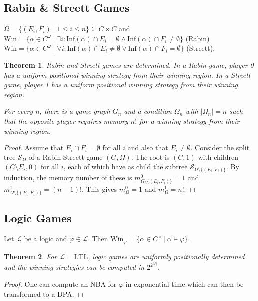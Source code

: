 \documentclass{article}
\newtheorem{theorem}{Theorem}
\begin{document}
\vspace{1.5cm}
\subsection{Rabin \& Streett Games}
$\Omega = \{(E_i, F_i) \mid 1 \leq i \leq n\} \subseteq C \times C$ and \\
$\text{Win} = \{ \alpha \in C^\omega \mid \exists i: \text{Inf}(\alpha) \cap E_i = \emptyset \land \text{Inf}(\alpha) \cap F_i \neq \emptyset \}$ (Rabin) \\
$\text{Win} = \{ \alpha \in C^\omega \mid \forall i: \text{Inf}(\alpha) \cap E_i \neq \emptyset \lor \text{Inf}(\alpha) \cap F_i = \emptyset \}$ (Streett).

\begin{theorem}
	Rabin and Streett games are determined. In a Rabin game, player 0 has a uniform positional winning strategy from their winning region. In a Streett game, player 1 has a uniform positional winning strategy from their winning region. 
	
	For every $n$, there is a game graph $G_n$ and a condition $\Omega_n$ with $|\Omega_n| = n$ such that the opposite player requires memory $n!$ for a winning strategy from their winning region.
\end{theorem}
\begin{proof}
	Assume that $E_i \cap F_i = \emptyset$ for all $i$ and also that $E_i \neq \emptyset$. Consider the split tree $\mathcal{S}_\Omega$ of a Rabin-Streett game $(G, \Omega)$. The root is $(C, 1)$ with children $(C \setminus E_i, 0)$ for all $i$, each of which have as child the subtree $\mathcal{S}_{\Omega \setminus \{(E_i, F_i)\}}$. By induction, the memory number of these is $m_{\Omega \setminus \{(E_i, F_i)\}}^0 = 1$ and $m_{\Omega \setminus \{(E_i, F_i)\}}^1 = (n-1)!$. This gives $m^0_\Omega = 1$ and $m^1_\Omega = n!$.
\end{proof}

\vspace{1.5cm}
\subsection{Logic Games}
Let $\mathcal{L}$ be a logic and $\varphi \in \mathcal{L}$. Then $\text{Win}_\varphi = \{ \alpha \in C^\omega \mid \alpha \models \varphi \}$.

\begin{theorem}
	For $\mathcal{L} = \text{LTL}$, logic games are uniformly positionally determined and the winning strategies can be computed in $2^{2^{|\varphi|}}$.
\end{theorem}
\begin{proof}
	One can compute an NBA for $\varphi$ in exponential time which can then be transformed to a DPA.
\end{proof}
\end{document}
